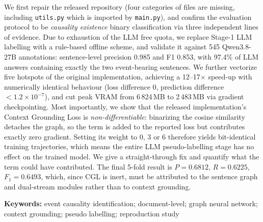 We first repair the released repository (four categories of files are missing, including
\texttt{utils.py} which is imported by \texttt{main.py}), and confirm the evaluation protocol
to be \emph{causality existence} binary classification via three independent lines of evidence.
Due to exhaustion of the LLM free quota, we replace Stage-1 LLM labelling with a rule-based
offline scheme, and validate it against 545 Qwen3.8-27B annotations: sentence-level precision
0.985 and F1 0.853, with 97.4\% of LLM answers containing exactly the two event-bearing sentences.
We further vectorize five hotspots of the original implementation, achieving a 12--17$\times$
speed-up with numerically identical behaviour (loss difference 0, prediction difference
$<1.2\times10^{-7}$), and cut peak VRAM from 6\,824\,MB to 2\,483\,MB via gradient checkpointing.
Most importantly, we show that the released implementation's Context Grounding Loss
is \emph{non-differentiable}: binarizing the cosine similarity detaches the graph, so the term
is added to the reported loss but contributes exactly zero gradient. Setting its weight to
0, 3 or 6 therefore yields bit-identical training trajectories, which means the entire
LLM pseudo-labelling stage has no effect on the trained model. We give a straight-through
fix and quantify what the term could have contributed. The final 5-fold result is
$P=0.6812$, $R=0.6225$, $F_1=0.6493$, which, since CGL is inert, must be attributed to the
sentence graph and dual-stream modules rather than to context grounding.

\vspace{0.6em}
\noindent\textbf{Keywords:} event causality identification; document-level; graph neural network;
context grounding; pseudo labelling; reproduction study

\newpage
